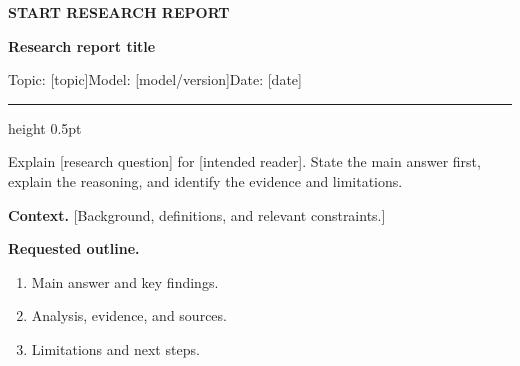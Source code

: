 \documentclass[11pt,letterpaper]{article}
\begin{document}
{\small\sffamily\bfseries\color{accent} START RESEARCH REPORT}\par
{\LARGE\bfseries Research report title}\par
{\small Topic: [topic]\quad Model: [model/version]\quad Date: [date]}\par
\medskip
\hrule height 0.5pt

\begin{promptmessage}
Explain [research question] for [intended reader]. State the main answer
first, explain the reasoning, and identify the evidence and limitations.

\textbf{Context.} [Background, definitions, and relevant constraints.]

\textbf{Requested outline.}
\begin{enumerate}
  \item Main answer and key findings.
  \item Analysis, evidence, and sources.
  \item Limitations and next steps.
\end{enumerate}
\end{promptmessage}
\end{document}
